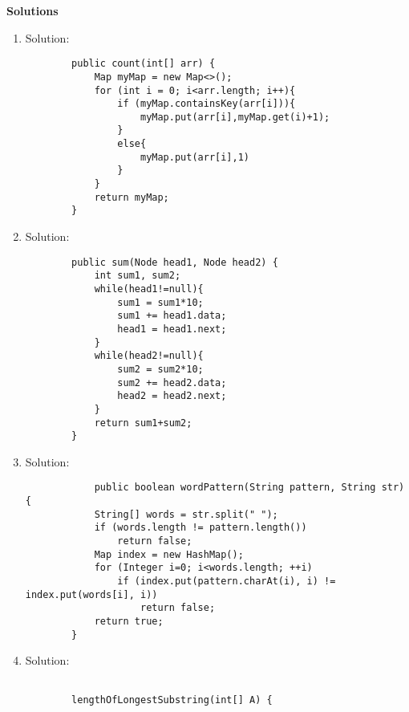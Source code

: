 \documentclass{article}
\begin{document}
    \begin{center}
        \textbf{Solutions}
    \end{center}

    \begin{enumerate}

        \item Solution:
        \begin{lstlisting}
        public count(int[] arr) {
            Map myMap = new Map<>();
            for (int i = 0; i<arr.length; i++){
                if (myMap.containsKey(arr[i])){
                    myMap.put(arr[i],myMap.get(i)+1);
                }
                else{
                    myMap.put(arr[i],1)
                }
            }
            return myMap;
        }
        \end{lstlisting}

        \item Solution:
        \begin{lstlisting}
        public sum(Node head1, Node head2) {
            int sum1, sum2;
            while(head1!=null){
                sum1 = sum1*10;
                sum1 += head1.data;
                head1 = head1.next;
            }
            while(head2!=null){
                sum2 = sum2*10;
                sum2 += head2.data;
                head2 = head2.next;
            }
            return sum1+sum2;
        }
        \end{lstlisting}


        \item Solution:

        \begin{lstlisting}
            public boolean wordPattern(String pattern, String str) {
            String[] words = str.split(" ");
            if (words.length != pattern.length())
                return false;
            Map index = new HashMap();
            for (Integer i=0; i<words.length; ++i)
                if (index.put(pattern.charAt(i), i) != index.put(words[i], i))
                    return false;
            return true;
        }
        \end{lstlisting}

        \item Solution:

        \begin{lstlisting}

        lengthOfLongestSubstring(int[] A) {


\end{lstlisting}
\end{enumerate}
\end{document}
